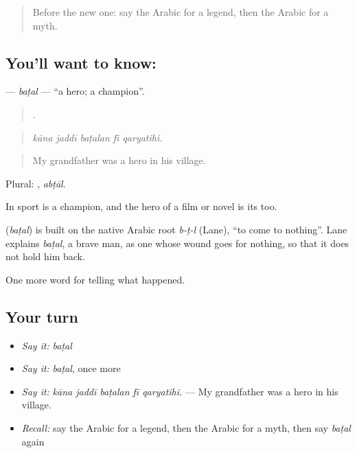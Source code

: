 \label{lesson:AR-C303-batal}



\begin{quote}
Before the new one: say the Arabic for a legend, then the Arabic for a myth.
\end{quote}

\subsection*{You'll want to know: }
\textbf{} — \emph{baṭal} — \textquotedblleft{}a hero; a champion\textquotedblright{}.

\begin{quote}
    .
\end{quote}

\begin{quote}
\emph{kāna jaddī baṭalan fī qaryatihi.}
\end{quote}

\begin{quote}
My grandfather was a hero in his village.
\end{quote}

Plural: , \emph{abṭāl}.

In sport  is a champion, and the hero of a film or novel is its  too.

\begin{cousinweb}
\textbf{} (\emph{baṭal}) is built on the native Arabic root \emph{b-ṭ-l} (Lane), \textquotedblleft{}to come to nothing\textquotedblright{}. Lane explains \emph{baṭal}, a brave man, as one whose wound goes for nothing, so that it does not hold him back.
\end{cousinweb}

\begin{grammarlens}[title={What you've built}]
One more word for telling what happened.
\end{grammarlens}

\subsection*{Your turn}
\begin{itemize}
\raggedright
  \item \emph{Say it:} \emph{baṭal}
  \item \emph{Say it:} \emph{baṭal}, once more
  \item \emph{Say it:} \emph{kāna jaddī baṭalan fī qaryatihi.} — My grandfather was a hero in his village.
  \item \emph{Recall:} say the Arabic for a legend, then the Arabic for a myth, then say \emph{baṭal} again
\end{itemize}

